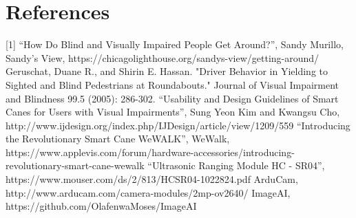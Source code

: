 \section{References}
[1] “How Do Blind and Visually Impaired People Get Around?”, Sandy Murillo, Sandy’s View, https://chicagolighthouse.org/sandys-view/getting-around/ 
\newline
[2] Geruschat, Duane R., and Shirin E. Hassan. "Driver Behavior in Yielding to Sighted and Blind Pedestrians at Roundabouts." Journal of Visual Impairment and Blindness 99.5 (2005): 286-302.
\newline
[3] “Usability and Design Guidelines of Smart Canes for Users with Visual Impairments”, Sung Yeon Kim and Kwangsu Cho, http://www.ijdesign.org/index.php/IJDesign/article/view/1209/559 
\newline
[4] “Introducing the Revolutionary Smart Cane WeWALK”, WeWalk, https://www.applevis.com/forum/hardware-accessories/introducing-revolutionary-smart-cane-wewalk
\newline
[5] “Ultrasonic Ranging Module HC - SR04”, https://www.mouser.com/ds/2/813/HCSR04-1022824.pdf
\newline
[6] ArduCam, http://www.arducam.com/camera-modules/2mp-ov2640/
\newline
[7] ImageAI, https://github.com/OlafenwaMoses/ImageAI


% 